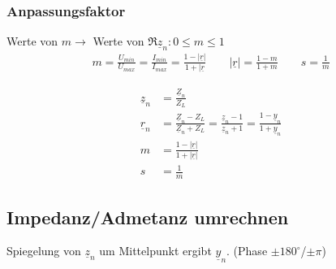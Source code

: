 \subsubsection{Anpassungsfaktor}
Werte von $ m \rightarrow$ Werte von $ \Re{\underline{z}_n}: 0 \leq m \leq1 $
\begin{align*}
	m = \frac{U_{min}}{U_{max}} = \frac{I_{min}}{I_{max}}=\frac{1-|\underline{r}|}{1+|\underline{r}} \qquad  |\underline{r}| = \frac{1-m}{1+m} \qquad s=\frac{1}{m}
\end{align*}
\begin{center}
    
\end{center}
\begin{align*}
    \underline{z}_n & = \frac{\underline{Z}_n}{Z_L}                                                                                                                   \\
    \underline{r}_n & = \frac{\underline{Z}_n-Z_L}{\underline{Z}_n+Z_L}= \frac{\underline{z}_n-1}{\underline{z}_n+1}    = \frac{1-\underline{y}_n}{1+\underline{y}_n} \\
    m               & = \frac{1-|\underline{r}|}{1+|\underline{r}|}                                                                                                   \\
    s               & = \frac{1}{m}
\end{align*}

\subsection{Impedanz/Admetanz umrechnen}
Spiegelung von $ \underline{z}_n $ um Mittelpunkt ergibt $ \underline{y}_n $.  (Phase $\pm 180^{\circ}$/$\pm \pi$)


\columnbreak

